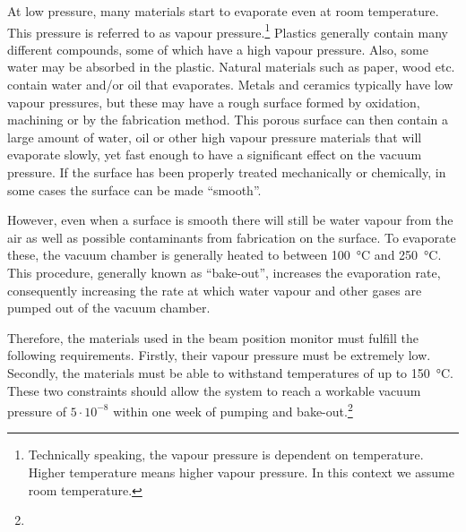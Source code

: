 At low pressure, many materials start to evaporate even at room temperature. This pressure is referred to as vapour pressure.\footnote{Technically speaking, the vapour pressure is dependent on temperature. Higher temperature means higher vapour pressure. In this context we assume room temperature.}
Plastics generally contain many different compounds, some of which have a high vapour pressure. Also, some water may be absorbed in the plastic.
Natural materials such as paper, wood etc. contain water and/or oil that evaporates.
Metals and ceramics typically have low vapour pressures, but these may have a rough surface formed by oxidation, machining or by the fabrication method. This porous surface can then contain a large amount of water, oil or other high vapour pressure materials that will evaporate slowly, yet fast enough to have a significant effect on the vacuum pressure. If the surface has been properly treated mechanically or chemically, in some cases the surface can be made ``smooth''.

However, even when a surface is smooth there will still be water vapour from the air as well as possible contaminants from fabrication on the surface. 
To evaporate these, the vacuum chamber is generally heated to between \SI{100}{\degreeCelsius} and \SI{250}{\degreeCelsius}. This procedure, generally known as ``bake-out'', increases the evaporation rate, consequently increasing the rate at which water vapour and other gases are pumped out of the vacuum chamber.

Therefore, the materials used in the beam position monitor must fulfill the following requirements. Firstly, their vapour pressure must be extremely low. Secondly, the materials must be able to withstand temperatures of up to \SI{150}{\degreeCelsius}. These two constraints should allow the system to reach a workable vacuum pressure of $5\cdot 10^{-8}$ within one week of pumping and bake-out.\footnote{}

